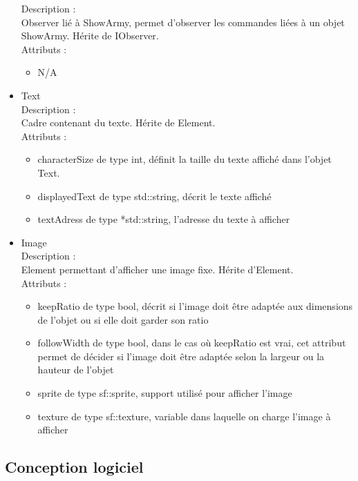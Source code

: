 \documentclass[a4paper,12pt]{article}
\begin{document}
\begin{itemize}
Description :\\
Observer lié à ShowArmy, permet d'observer les commandes liées à un objet ShowArmy. Hérite de IObserver.\\
Attributs :
\begin{itemize}
\item N/A\\
\end{itemize}
\item Text\\
Description :\\
Cadre contenant du texte. Hérite de Element.\\
Attributs :
\begin{itemize}
\item characterSize de type int, définit la taille du texte affiché dans l'objet Text.
\item displayedText de type std::string, décrit le texte affiché
\item textAdress de type *std::string, l'adresse du texte à afficher\\
\end{itemize}
\item Image\\
Description :\\
Element permettant d'afficher une image fixe. Hérite d'Element.\\
Attributs :
\begin{itemize}
\item keepRatio de type bool, décrit si l'image doit être adaptée aux dimensions de l'objet ou si elle doit garder son ratio
\item followWidth de type bool, dans le cas où keepRatio est vrai, cet attribut permet de décider si l'image doit être adaptée selon la largeur ou la hauteur de l'objet
\item sprite de type sf::sprite, support utilisé pour afficher l'image
\item texture de type sf::texture, variable dans laquelle on charge l'image à afficher\\
\end{itemize}
\end{itemize}

 

\subsection{Conception logiciel}
\end{document}
